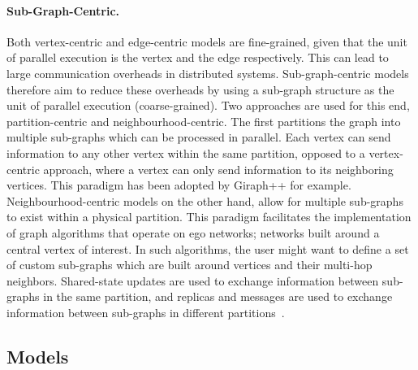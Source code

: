     \paragraph{\textbf{Sub-Graph-Centric}.} Both vertex-centric and edge-centric models are fine-grained, given that the unit of parallel execution is the vertex and the edge respectively. This can lead to large communication overheads in distributed systems. Sub-graph-centric models therefore aim to reduce these overheads by using a sub-graph structure as the unit of parallel execution (coarse-grained). Two approaches are used for this end, partition-centric and neighbourhood-centric. The first partitions the graph into multiple sub-graphs which can be processed in parallel. Each vertex can send information to any other vertex within the same partition, opposed to a vertex-centric approach, where a vertex can only send information to its neighboring vertices. This paradigm has been adopted by Giraph++ for example. Neighbourhood-centric models on the other hand, allow for multiple sub-graphs to exist within a physical partition. This paradigm facilitates the implementation of graph algorithms that operate on ego networks; networks built around a central vertex of interest. In such algorithms, the user might want to define a set of custom sub-graphs which are built around vertices and their multi-hop neighbors. Shared-state updates are used to exchange information between sub-graphs in the same partition, and replicas and messages are used to exchange information between sub-graphs in different partitions~\cite{paper:high_level_distributed_graph}.
    

    \subsection{Models}


